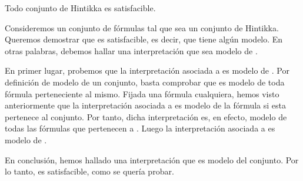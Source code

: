 \begin{isabellebody}
\begin{isamarkuptext}
  \begin{teorema}
    Todo conjunto de Hintikka es satisfacible.
  \end{teorema}

  \begin{demostracion}
    Consideremos un conjunto de fórmulas  tal que sea un conjunto de 
    Hintikka. Queremos demostrar que  es satisfacible, es decir, que 
    tiene algún modelo. En otras palabras, debemos hallar una 
    interpretación que sea modelo de .

    En primer lugar, probemos que la interpretación asociada a  es 
    modelo de . Por definición de modelo de un conjunto, basta 
    comprobar que es modelo de toda fórmula perteneciente al mismo. 
    Fijada una fórmula cualquiera, hemos visto anteriormente que la 
    interpretación asociada a  es modelo de la fórmula si esta 
    pertenece al conjunto. Por tanto, dicha interpretación es, en 
    efecto, modelo de todas las fórmulas que pertenecen a . Luego la 
    interpretación asociada a  es modelo de .

    En conclusión, hemos hallado una interpretación que es modelo del
    conjunto. Por lo tanto,  es satisfacible, como se quería probar.
  \end{demostracion}


\end{isamarkuptext}
\end{isabellebody}
